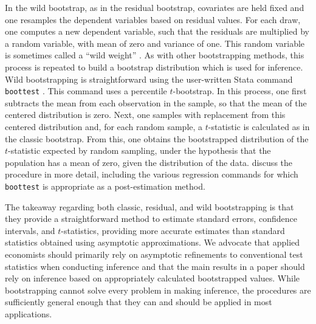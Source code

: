 \documentclass[11pt]{article}
\begin{document}
In the wild bootstrap, as in the residual bootstrap, covariates are held fixed and one resamples the dependent variables based on residual values. For each draw, one computes a new dependent variable, such that the residuals are multiplied by a random variable, with mean of zero and variance of one. This random variable is sometimes called a ``wild weight'' \citep{roodman_fast_2019}. As with other bootstrapping methods, this process is repeated to build a bootstrap distribution which is used for inference. Wild bootstrapping is straightforward using the user-written Stata command \texttt{boottest} \citep{roodman_boottest_2015}. This command uses a percentile $t$-bootstrap. In this process, one first subtracts the mean from each observation in the sample, so that the mean of the centered distribution is zero. Next, one samples with replacement from this centered distribution and, for each random sample, a $t$-statistic is calculated as in the classic bootstrap. From this, one obtains the bootstrapped distribution of the $t$-statistic expected by random sampling, under the hypothesis that the population has a mean of zero, given the distribution of the data. \cite{roodman_boottest_2015} discuss the procedure in more detail, including the various regression commands for which \texttt{boottest} is appropriate as a post-estimation method.

The takeaway regarding both classic, residual, and wild bootstrapping is that they provide a straightforward method to estimate standard errors, confidence intervals, and $t$-statistics, providing more accurate estimates than standard statistics obtained using asymptotic approximations. We advocate that applied economists should primarily rely on asymptotic refinements to conventional test statistics when conducting inference and that the main results in a paper should rely on inference based on appropriately calculated bootstrapped values. While bootstrapping cannot solve every problem in making inference, the procedures are sufficiently general enough that they can and should be applied in most applications.  

\end{document}
